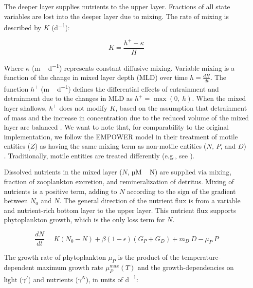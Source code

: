 \documentclass[journal abbreviation, manuscript]{copernicus}
\begin{document}
The deeper layer supplies nutrients to the upper layer. Fractions of all state variables are  lost into the deeper layer due to mixing. The rate of mixing is described by $K$ (\unit{d^{−1}}):

\begin{equation}
    K = \frac{h^{+} + \kappa}{H}
\end{equation}

Where $\kappa$ (\unit{m\,d^{−1}}) represents constant diffusive mixing. Variable mixing is a function of the change in mixed layer depth (MLD) over time $h = \frac{dH}{dt}$. The function $h^{+}$ (\unit{m\,d^{−1}}) defines the differential effects of entrainment and detrainment due to the changes in MLD as $h^{+} = \max(0, \ h)$. When the mixed layer shallows, $h^{+}$ does not modify $K$, based on the assumption that detrainment of mass and the increase in concentration due to the reduced volume of the mixed layer are balanced \citep{Evans1985ACycles}. We want to note that, for comparability to the original implementation, we follow the EMPOWER model in their treatment of motile entities ($Z$) as having the same mixing term as non-motile entities ($N$, $P$, and $D$) \citep{Anderson2015c}. Traditionally, motile entities are treated differently (e.g., see \citep{Fasham1990a}).

Dissolved nutrients in the mixed layer ($N$, \unit{µM\,N}) are supplied via mixing, fraction of zooplankton excretion, and remineralization of detritus. Mixing of nutrients is a positive term, adding to $N$ according to the sign of the gradient between $N_0$ and $N$. The general direction of the nutrient flux is from a variable and nutrient-rich bottom layer to the upper layer. This nutrient flux supports phytoplankton growth, which is the only loss term for $N$.

\begin{equation}
    \frac{d N}{d t} = 
    K (N_0 - N) %
    + \beta(1 - \epsilon)(G_P + G_D) %
    + m_D \ D %
    - \mu_{P} \ P %
\end{equation}

The growth rate of phytoplankton $\mu_{P}$ is the product of the temperature-dependent maximum growth rate $\mu_P^{max}(T)$ and the growth-dependencies on light ($\gamma^{I}$) and nutrients ($\gamma^{N}$), in units of \unit{d^{−1}}: 
\end{document}
